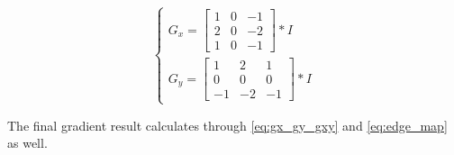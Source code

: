 \documentclass[12pt]{article}
\begin{document}
\begin{equation}
\begin{cases}
	G_x = \begin{bmatrix}
		1 & 0 & -1 \\ 2 & 0 & -2 \\ 1 & 0 & -1 
	\end{bmatrix} \ast I \\
	G_y = \begin{bmatrix}
		1 & 2 & 1 \\ 0 & 0 & 0 \\ -1 & -2 & -1
	\end{bmatrix} \ast I
\end{cases}
\end{equation}

\noindent
The final gradient result calculates through \autoref{eq:gx_gy_gxy} and \autoref{eq:edge_map} as well.
\end{document}

